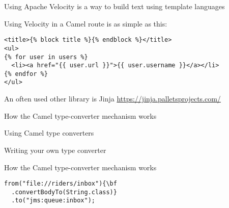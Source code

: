 \documentclass[Screen16to9,17pt]{foils}
\begin{document}
\begin{list2}
\item Using Apache Velocity is a way to build text using template languages
\end{list2}



Using Velocity in a Camel route is as simple as this:

\begin{verbatim}
<title>{% block title %}{% endblock %}</title>
<ul>
{% for user in users %}
  <li><a href="{{ user.url }}">{{ user.username }}</a></li>
{% endfor %}
</ul>
\end{verbatim}

\begin{list2}
\item An often used other library is Jinja \url{https://jinja.palletsprojects.com/}
\end{list2}





\begin{list2}
\item How the Camel type-converter mechanism works
\item Using Camel type converters
\item Writing your own type converter
\end{list2}



\begin{list2}
\item How the Camel type-converter mechanism works
\end{list2}


\begin{verbatim}
from("file://riders/inbox"){\bf
  .convertBodyTo(String.class)}
  .to("jms:queue:inbox");
\end{verbatim}



\end{document}
